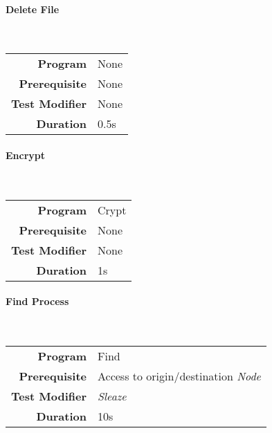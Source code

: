 \hfill

\paragraph{Delete File}
\label{par: delete file}

\mbox{}\\

\begin{tabular}{rl}
    \textbf{Program}       & None \\
    \textbf{Prerequisite}  & None \\
    \textbf{Test Modifier} & None \\
    \textbf{Duration}      & 0.5s \\
\end{tabular}

\hfill

\paragraph{Encrypt}
\label{par: encrypt}

\mbox{}\\

\begin{tabular}{rl}
    \textbf{Program}       & Crypt \\
    \textbf{Prerequisite}  & None  \\
    \textbf{Test Modifier} & None  \\
    \textbf{Duration}      & 1s    \\
\end{tabular}

\hfill

\paragraph{Find Process}
\label{par: find process}

\mbox{}\\

\begin{tabular}{rl}
    \textbf{Program}       & Find                                     \\
    \textbf{Prerequisite}  & Access to origin/destination \emph{Node} \\
    \textbf{Test Modifier} & \emph{Sleaze}                            \\
    \textbf{Duration}      & 10s                                      \\
\end{tabular}

